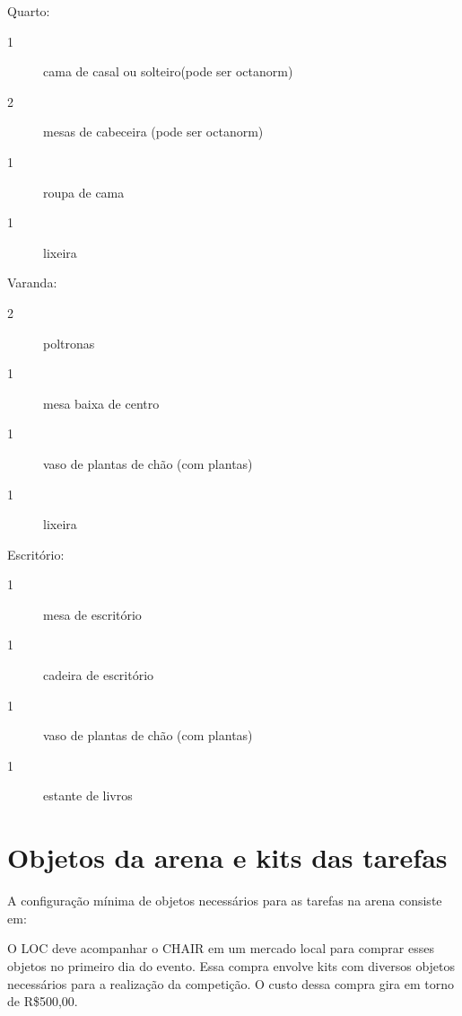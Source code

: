 \documentclass[11pt, twoside, openright, a4paper, chapterprefix]{article}
\begin{document}
Quarto:
\begin{description}
    \item [1] cama de casal ou solteiro(pode ser octanorm)
    \item [2] mesas de cabeceira (pode ser octanorm)
    \item [1] roupa de cama
    \item [1] lixeira
\end{description}

Varanda:
\begin{description}
    \item [2] poltronas
    \item [1] mesa baixa de centro 
    \item [1] vaso de plantas de chão (com plantas)
    \item [1] lixeira
\end{description}

Escritório:
\begin{description}
    \item [1] mesa de escritório
    \item [1] cadeira de escritório 
    \item [1] vaso de plantas de chão (com plantas)
    \item [1] estante de livros
\end{description}

\section{Objetos da arena e kits das tarefas}
A configuração mínima de objetos necessários para as tarefas na arena consiste em:

O LOC deve acompanhar o CHAIR em um mercado local para comprar esses objetos no primeiro dia do evento.
Essa compra envolve kits com diversos objetos necessários para a realização da competição.
O custo dessa compra gira em torno de R\$500,00.
\end{document}
